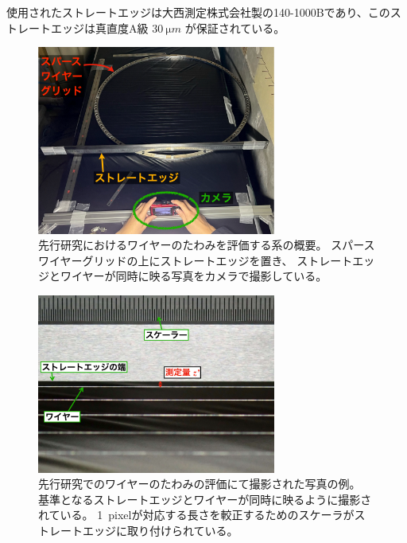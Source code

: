 \documentclass[../../main.tex]{subfiles}
\begin{document}
使用されたストレートエッジは大西測定株式会社製の140-1000Bであり、このストレートエッジは真直度A級 $\SI{30}{\micro m}$ が保証されている。
\begin{figure}[H]
    \centering
    \includegraphics[width=0.7\textwidth]{wiregrid/wiresag_setup_overview_old.pdf}
    \caption{先行研究におけるワイヤーのたわみを評価する系の概要。
    スパースワイヤーグリッドの上にストレートエッジを置き、
    ストレートエッジとワイヤーが同時に映る写真をカメラで撮影している。
    }
    \label{fig:wiresag_setup_overview_old}
\end{figure}
\begin{figure}[H]
    \centering
    \includegraphics[width=0.7\textwidth]{wiregrid/wiresag_picture_old.pdf}
    \caption{先行研究でのワイヤーのたわみの評価にて撮影された写真の例。
    基準となるストレートエッジとワイヤーが同時に映るように撮影されている。
    \SI{1}{pixel}が対応する長さを較正するためのスケーラがストレートエッジに取り付けられている。}
    \label{fig:wiresag_picture_old}
\end{figure}
\end{document}

